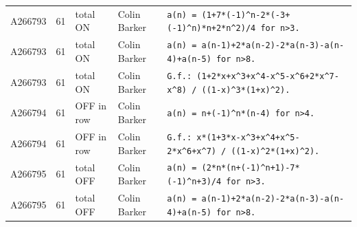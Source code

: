 \documentclass[11pt]{article}
\theoremstyle{definition}
\theoremstyle{remark}
\begin{document}
{\begin{longtable}{p{1.3cm}p{0.7cm}p{2.4cm}p{2.3cm}p{7.3cm}}
A266793 & 61 & total ON & Colin Barker & \texttt{a(n)\allowbreak{} \allowbreak{}=\allowbreak{} \allowbreak{}(1+\allowbreak{}7*\allowbreak{}(-\allowbreak{}1)\allowbreak{}\^{}n-\allowbreak{}2*\allowbreak{}(-\allowbreak{}3+\allowbreak{}(-\allowbreak{}1)\allowbreak{}\^{}n)\allowbreak{}*\allowbreak{}n+\allowbreak{}2*\allowbreak{}n\^{}2)\allowbreak{}/\allowbreak{}4 \allowbreak{}for \allowbreak{}n>3.} \\
A266793 & 61 & total ON & Colin Barker & \texttt{a(n)\allowbreak{} \allowbreak{}=\allowbreak{} \allowbreak{}a(n-\allowbreak{}1)\allowbreak{}+\allowbreak{}2*\allowbreak{}a(n-\allowbreak{}2)\allowbreak{}-\allowbreak{}2*\allowbreak{}a(n-\allowbreak{}3)\allowbreak{}-\allowbreak{}a(n-\allowbreak{}4)\allowbreak{}+\allowbreak{}a(n-\allowbreak{}5)\allowbreak{} \allowbreak{}for \allowbreak{}n>8.} \\
A266793 & 61 & total ON & Colin Barker & \texttt{G.f.: \allowbreak{}(1+\allowbreak{}2*\allowbreak{}x+\allowbreak{}x\^{}3+\allowbreak{}x\^{}4-\allowbreak{}x\^{}5-\allowbreak{}x\^{}6+\allowbreak{}2*\allowbreak{}x\^{}7-\allowbreak{}x\^{}8)\allowbreak{} \allowbreak{}/\allowbreak{} \allowbreak{}((1-\allowbreak{}x)\allowbreak{}\^{}3*\allowbreak{}(1+\allowbreak{}x)\allowbreak{}\^{}2)\allowbreak{}.} \\
A266794 & 61 & OFF in row & Colin Barker & \texttt{a(n)\allowbreak{} \allowbreak{}=\allowbreak{} \allowbreak{}n+\allowbreak{}(-\allowbreak{}1)\allowbreak{}\^{}n*\allowbreak{}(n-\allowbreak{}4)\allowbreak{} \allowbreak{}for \allowbreak{}n>4.} \\
A266794 & 61 & OFF in row & Colin Barker & \texttt{G.f.: \allowbreak{}x*\allowbreak{}(1+\allowbreak{}3*\allowbreak{}x-\allowbreak{}x\^{}3+\allowbreak{}x\^{}4+\allowbreak{}x\^{}5-\allowbreak{}2*\allowbreak{}x\^{}6+\allowbreak{}x\^{}7)\allowbreak{} \allowbreak{}/\allowbreak{} \allowbreak{}((1-\allowbreak{}x)\allowbreak{}\^{}2*\allowbreak{}(1+\allowbreak{}x)\allowbreak{}\^{}2)\allowbreak{}.} \\
A266795 & 61 & total OFF & Colin Barker & \texttt{a(n)\allowbreak{} \allowbreak{}=\allowbreak{} \allowbreak{}(2*\allowbreak{}n*\allowbreak{}(n+\allowbreak{}(-\allowbreak{}1)\allowbreak{}\^{}n+\allowbreak{}1)\allowbreak{}-\allowbreak{}7*\allowbreak{}(-\allowbreak{}1)\allowbreak{}\^{}n+\allowbreak{}3)\allowbreak{}/\allowbreak{}4 \allowbreak{}for \allowbreak{}n>3.} \\
A266795 & 61 & total OFF & Colin Barker & \texttt{a(n)\allowbreak{} \allowbreak{}=\allowbreak{} \allowbreak{}a(n-\allowbreak{}1)\allowbreak{}+\allowbreak{}2*\allowbreak{}a(n-\allowbreak{}2)\allowbreak{}-\allowbreak{}2*\allowbreak{}a(n-\allowbreak{}3)\allowbreak{}-\allowbreak{}a(n-\allowbreak{}4)\allowbreak{}+\allowbreak{}a(n-\allowbreak{}5)\allowbreak{} \allowbreak{}for \allowbreak{}n>8.} \\

\end{longtable}}
\end{document}
